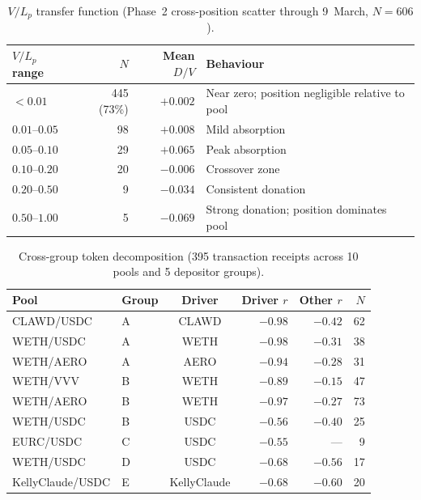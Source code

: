 \documentclass{manuscript}
\begin{document}
\begin{table}[H]
\centering
\caption{$V/L_p$ transfer function (Phase~2 cross-position scatter through 9~March, $N = 606$).}\label{tab:vl-buckets}
\begin{tabular}{@{}lrrl@{}}
\toprule
$V/L_p$ range & $N$ & Mean $D/V$ & Behaviour \\
\midrule
$< 0.01$       & 445 (73\%) & $+0.002$ & Near zero; position negligible relative to pool \\
$0.01$--$0.05$ & 98         & $+0.008$ & Mild absorption \\
$0.05$--$0.10$ & 29         & $+0.065$ & Peak absorption \\
$0.10$--$0.20$ & 20         & $-0.006$ & Crossover zone \\
$0.20$--$0.50$ & 9          & $-0.034$ & Consistent donation \\
$0.50$--$1.00$ & 5          & $-0.069$ & Strong donation; position dominates pool \\
\bottomrule
\end{tabular}
\end{table}

\begin{table}[H]
\centering
\caption{Cross-group token decomposition (395 transaction receipts across 10 pools and 5 depositor groups).}
\label{tab:cross-group}
\begin{tabular}{@{}llcrrr@{}}
\toprule
Pool & Group & Driver & Driver $r$ & Other $r$ & $N$ \\
\midrule
CLAWD/USDC       & A & CLAWD       & $-0.98$ & $-0.42$ & 62 \\
WETH/USDC        & A & WETH        & $-0.98$ & $-0.31$ & 38 \\
WETH/AERO        & A & AERO        & $-0.94$ & $-0.28$ & 31 \\
WETH/VVV         & B & WETH        & $-0.89$ & $-0.15$ & 47 \\
WETH/AERO        & B & WETH        & $-0.97$ & $-0.27$ & 73 \\
WETH/USDC        & B & USDC        & $-0.56$ & $-0.40$ & 25 \\
EURC/USDC        & C & USDC        & $-0.55$ & ---     & 9  \\
WETH/USDC        & D & USDC        & $-0.68$ & $-0.56$ & 17 \\
KellyClaude/USDC & E & KellyClaude & $-0.68$ & $-0.60$ & 20 \\
\bottomrule
\end{tabular}
\end{table}
\end{document}
